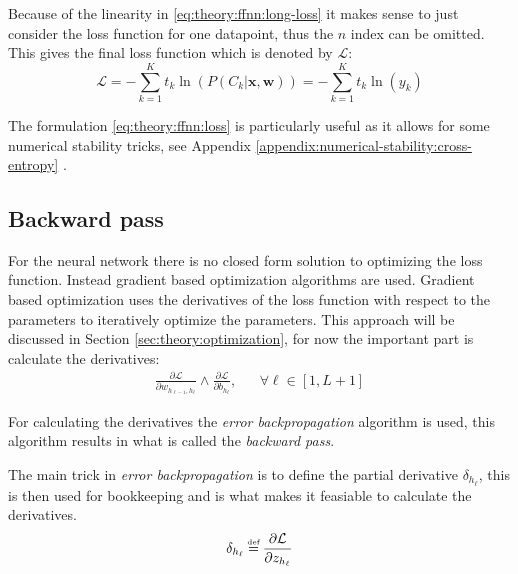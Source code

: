 Because of the linearity in \eqref{eq:theory:ffnn:long-loss} it makes sense to just consider the loss function for one datapoint, thus the $n$ index can be omitted. This gives the final loss function which is denoted by $\mathcal{L}$:
\begin{equation}
\mathcal{L} = - \sum_{k=1}^K t_{k} \ln\left( P(C_{k} | \mathbf{x}, \mathbf{w})\right) =  - \sum_{k=1}^K t_k \ln(y_k)
\label{eq:theory:ffnn:loss}
\end{equation}

The formulation \eqref{eq:theory:ffnn:loss} is particularly useful as it allows for some numerical stability tricks, see Appendix \ref{appendix:numerical-stability:cross-entropy} .

\subsection{Backward pass}

For the neural network there is no closed form solution to optimizing the loss function. Instead gradient based optimization algorithms are used. Gradient based optimization uses the derivatives of the loss function with respect to the parameters to iteratively optimize the parameters. This approach will be discussed in Section \ref{sec:theory:optimization}, for now the important part is calculate the derivatives:
\begin{equation}
\begin{aligned}
\frac{\partial \mathcal{L}}{\partial w_{h_{\ell-1}, h_\ell}} \wedge \frac{\partial \mathcal{L}}{\partial b_{h_\ell}}, && \forall \ell \in [1, L + 1]
\end{aligned}
\label{eq:theory:ffnn:bprop-problem}
\end{equation}

For calculating the derivatives the \textit{error backpropagation} algorithm is used, this algorithm results in what is called the \textit{backward pass}.

The main trick in \textit{error backpropagation} is to define the partial derivative $\delta_{h_\ell}$, this is then used for bookkeeping and is what makes it feasiable to calculate the derivatives.
\begin{equation}
\delta_{h_\ell} \defeq \frac{\partial \mathcal{L}}{\partial z_{h_\ell}}
\end{equation}

